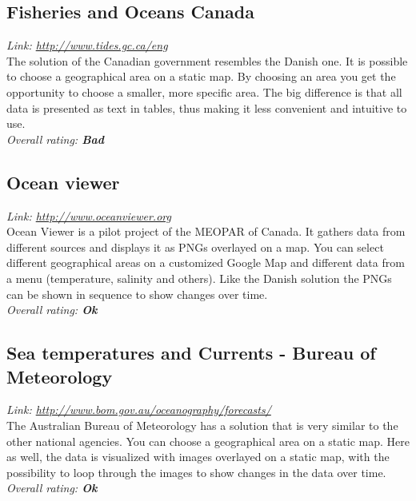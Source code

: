 \documentclass[11pt,a4paper,titlepage,oneside]{report}
\begin{document}
  \subsection{Fisheries and Oceans Canada}
  \emph{Link: \url{http://www.tides.gc.ca/eng}} \\%
    The solution of the Canadian government resembles the Danish one. It is possible to choose a geographical area on a static map. By choosing an area you get the opportunity to choose a smaller, more specific area. The big difference is that all data is presented as text in tables, thus making it less convenient and intuitive to use.
  \\ \emph{Overall rating: \textbf{Bad}}

  \subsection{Ocean viewer}
  \emph{Link: \url{http://www.oceanviewer.org}} \\%
    Ocean Viewer is a pilot project of the \gls{MEOPAR} of Canada. It gathers data from different sources and displays it as PNGs overlayed on a map. You can select different geographical areas on a customized Google Map and different data from a menu (temperature, salinity and others). Like the Danish solution the PNGs can be shown in sequence to show changes over time.
  \\ \emph{Overall rating: \textbf{Ok}}

  \subsection{Sea temperatures and Currents - Bureau of Meteorology}
  \emph{Link: \url{http://www.bom.gov.au/oceanography/forecasts/}} \\%
    The Australian Bureau of Meteorology has a solution that is very similar to the other national agencies. You can choose a geographical area on a static map. Here as well, the data is visualized with images overlayed on a static map, with the possibility to loop through the images to show changes in the data over time.
  \\ \emph{Overall rating: \textbf{Ok}}
  
\end{document}
